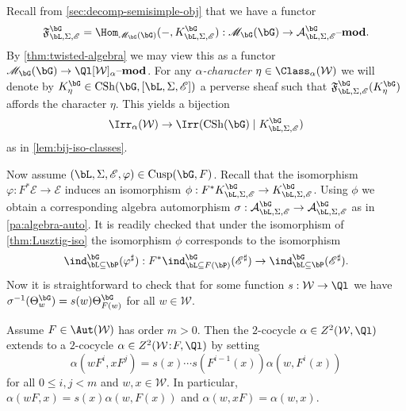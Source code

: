 \documentclass[eqthmnum,nocolour,skinny]{jt-calcs}
\DeclareMathOperator{\CS}{CSh}
\DeclareMathOperator{\Cusp}{Cusp}
\newcommand{\lmod}[1]{\ensuremath{#1\text{--{\bf mod}}}}
\newcommand\sd{
	\mathchoice{\mkern1.5mu}{\mkern1.5mu}{}{}%
	{:}%
	\mathchoice{\mkern1.5mu}{\mkern1.5mu}{}{}
}
\begin{document}
\begin{pa}\label{pa:HC-param-char-sheaves}
Recall from \cref{sec:decomp-semisimple-obj} that we have a functor
\begin{equation*}
\mathfrak{F}_{\bL,\Sigma,\mathscr{E}}^{\bG} = \Hom_{\mathscr{M}_{\bG}(\bG)}(-,K_{\bL,\Sigma,\mathscr{E}}^{\bG}) : \mathscr{M}_{\bG}(\bG) \to \lmod{\mathcal{A}_{\bL,\Sigma,\mathscr{E}}^{\bG}}.
\end{equation*}
By \cref{thm:twisted-algebra} we may view this as a functor $\mathscr{M}_{\bG}(\bG) \to \lmod{\Ql[\mathcal{W}]_{\alpha}}$. For any \emph{$\alpha$-character} $\eta \in \Class_{\alpha}(\mathcal{W})$ we will denote by $K_{\eta}^{\bG} \in \CS(\bG,[\bL,\Sigma,\mathscr{E}])$ a perverse sheaf such that $\mathfrak{F}_{\bL,\Sigma,\mathscr{E}}^{\bG}(K_{\eta}^{\bG})$ affords the character $\eta$. This yields a bijection
\begin{equation*}
\Irr_{\alpha}(\mathcal{W}) \to \Irr(\CS(\bG) \mid K_{\bL,\Sigma,\mathscr{E}}^{\bG})
\end{equation*}
as in \cref{lem:bij-iso-classes}.
\end{pa}

\begin{pa}
Now assume $(\bL,\Sigma,\mathscr{E},\varphi) \in \Cusp(\bG,F)$. Recall that the isomorphism $\varphi : F^*\mathscr{E} \to \mathscr{E}$ induces an isomorphism $\phi : F^*K_{\bL,\Sigma,\mathscr{E}}^{\bG} \to K_{\bL,\Sigma,\mathscr{E}}^{\bG}$. Using $\phi$ we obtain a corresponding algebra automorphism $\sigma : \mathcal{A}_{\bL,\Sigma,\mathscr{E}}^{\bG} \to \mathcal{A}_{\bL,\Sigma,\mathscr{E}}^{\bG}$ as in \cref{pa:algebra-auto}. It is readily checked that under the isomorphism of \cref{thm:Lusztig-iso} the isomorphism $\phi$ corresponds to the isomorphism
\begin{equation*}
\ind_{\bL \subseteq \bP}^{\bG}(\varphi^{\sharp}) : F^*\ind_{\bL \subseteq F(\bP)}^{\bG}(\mathscr{E}^{\sharp}) \to \ind_{\bL \subseteq \bP}^{\bG}(\mathscr{E}^{\sharp}).
\end{equation*}
Now it is straightforward to check that for some function $s : \mathcal{W} \to \Ql$ we have $\sigma^{-1}(\Theta_w^{\bG}) = s(w)\Theta_{F(w)}^{\bG}$ for all $w \in \mathcal{W}$.
\end{pa}

\begin{lem}\label{lem:ext-2-cocycle}
Assume $F \in \Aut(\mathcal{W})$ has order $m > 0$. Then the $2$-cocycle $\alpha \in Z^2(\mathcal{W},\Ql)$ extends to a $2$-cocycle $\alpha \in Z^2(\mathcal{W}\sd F,\Ql)$ by setting
\begin{equation*}
\alpha(wF^i,xF^j) = s(x)\cdots s(F^{i-1}(x))\alpha(w,F^i(x))
\end{equation*}
for all $0 \leqslant i,j < m$ and $w,x \in \mathcal{W}$. In particular, $\alpha(wF,x) = s(x)\alpha(w,F(x))$ and $\alpha(w,xF) = \alpha(w,x)$.
\end{lem}
\end{document}
